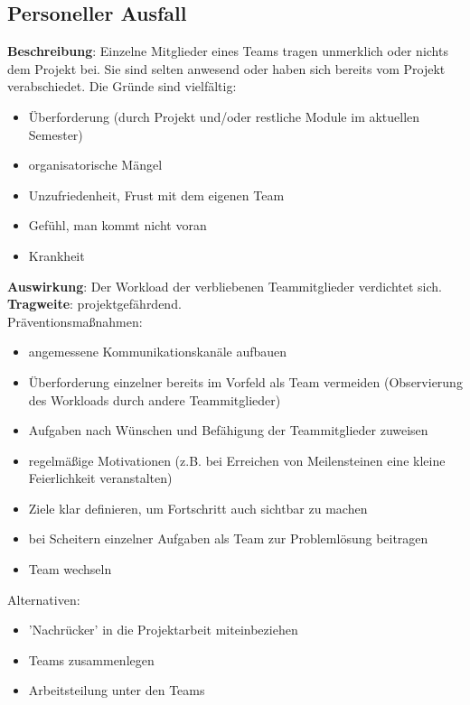\documentclass[a4paper, 12pt, titlepage]{scrartcl}
\begin{document}
	\subsection{Personeller Ausfall}
		\textbf{Beschreibung}: Einzelne Mitglieder eines Teams tragen unmerklich oder nichts dem Projekt bei. Sie sind selten anwesend oder haben sich bereits vom Projekt verabschiedet. Die Gr\"unde sind vielf\"altig:
			\begin{itemize}
				\item \"Uberforderung (durch Projekt und/oder restliche Module im aktuellen Semester)
				\item organisatorische M\"angel
				\item Unzufriedenheit, Frust mit dem eigenen Team
				\item Gef\"uhl, man kommt nicht voran
				\item Krankheit
			\end{itemize}
		\textbf{Auswirkung}: Der Workload der verbliebenen Teammitglieder verdichtet sich. \\
		\textbf{Tragweite}: projektgef\"ahrdend.\\
		Pr\"aventionsma\ss nahmen:
			\begin{itemize}
				\item angemessene Kommunikationskan\"ale aufbauen
				\item \"Uberforderung einzelner bereits im Vorfeld als Team vermeiden (Observierung des Workloads durch andere Teammitglieder)
				\item Aufgaben nach W\"unschen und Bef\"ahigung der Teammitglieder zuweisen
				\item regelm\"a\ss ige Motivationen (z.B. bei Erreichen von Meilensteinen eine kleine Feierlichkeit veranstalten)
				\item Ziele klar definieren, um Fortschritt auch sichtbar zu machen
				\item bei Scheitern einzelner Aufgaben als Team zur Probleml\"osung beitragen
				\item Team wechseln
			\end{itemize}
		Alternativen:
			\begin{itemize}
				\item 'Nachr\"ucker' in die Projektarbeit miteinbeziehen
				\item Teams zusammenlegen
				\item Arbeitsteilung unter den Teams
			\end{itemize} 
		
\end{document}
